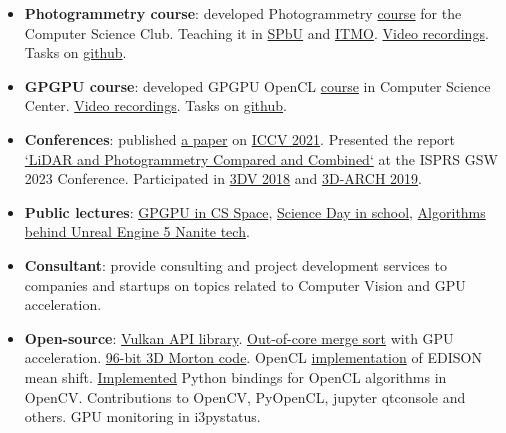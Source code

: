 \documentclass[11pt,oneside]{article}
\newcommand{\hhref}[2]{\href{#1}{\color{blue}#2}}
\begin{document}
\begin{itemize}
    \item{\textbf{Photogrammetry course}}: developed Photogrammetry  \hhref{https://compsciclub.ru/courses/photogrammetry/2021-spring/}{course} for the Computer Science Club. Teaching it in \hhref{https://math-cs.spbu.ru/}{SPbU} and \hhref{https://ct.itmo.ru/}{ITMO}.  \hhref{https://www.youtube.com/watch?v=rEF0zkv2cn8&list=PL5p-5hHpsHBp4yTpeZJ_QMSmJPAuov-VF&index=1}{Video recordings}. Tasks on \hhref{https://github.com/PhotogrammetryCourse/}{github}.

    \item{\textbf{GPGPU course}}: developed GPGPU OpenCL \hhref{https://compscicenter.ru/courses/video_cards_computation/}{course} in Computer Science Center. \hhref{https://www.youtube.com/watch?v=LDt4KQEdImY&list=PLlb7e2G7aSpSkDWlyJQzT9Qx9rrgKSgAp&index=1}{Video recordings}. Tasks on \hhref{https://github.com/GPGPUCourse/}{github}.

    \item{\textbf{Conferences}}: published \hhref{https://www.polarnick.com/static/papers/poliarnyi2021.pdf}{a paper} on \hhref{http://iccv2021.thecvf.com/}{ICCV 2021}. Presented the report \hhref{https://polarnick.com/static/presentations/AgisoftMetashapeGSW2023.pdf}{‘LiDAR and Photogrammetry Compared and Combined‘} at the ISPRS GSW 2023 Conference. Participated in \hhref{http://3dv18.uniud.it/}{3DV 2018} and \hhref{http://www.3d-arch.org/}{3D-ARCH 2019}.

    \item{\textbf{Public lectures}}: \hhref{https://csspace.io/open-lecture/2025-gpu}{GPGPU in CS Space}, \hhref{https://www.youtube.com/watch?v=adQQoH3iXPQ}{Science Day in school}, \hhref{https://www.youtube.com/watch?v=ltUzX1IR9JI&list=PL5p-5hHpsHBolSeDn7__1c9hgPprYTjnn&index=3}{Algorithms behind Unreal Engine 5 Nanite tech}.

    \item{\textbf{Consultant}}: provide consulting and project development services to companies and startups on topics related to Computer Vision and GPU acceleration.

    \item{\textbf{Open-source}: \hhref{https://github.com/GPGPUCourse/GPGPUVulkan}{Vulkan API library}. \hhref{https://github.com/PolarNick239/ExternalSortingOnGPU}{Out-of-core merge sort} with GPU acceleration. \hhref{https://gist.github.com/PolarNick239/7819fb7722fab09b37ecaee77c82cf58}{96-bit 3D Morton code}. OpenCL \hhref{https://github.com/PolarNick239/OpenMeanShift}{implementation} of EDISON mean shift. \hhref{https://github.com/opencv/opencv/pull/6078}{Implemented} Python bindings for OpenCL algorithms in OpenCV. Contributions to OpenCV, PyOpenCL, jupyter qtconsole and others. GPU monitoring in i3pystatus.}


\end{itemize}
\end{document}
